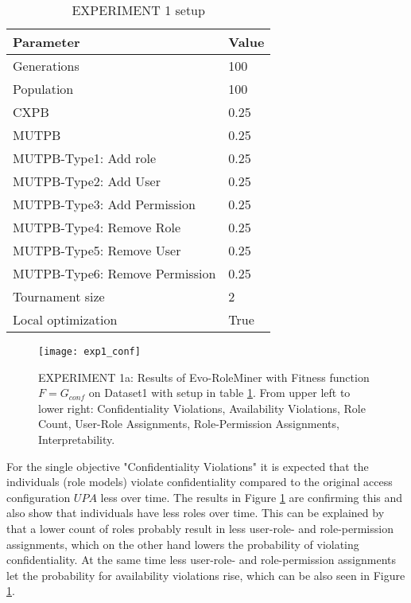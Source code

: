 \begin{table}[H]
    \centering
    \begin{adjustbox}{width=0.5\textwidth}
	    \begin{tabular}{|l|l|}
	        \hline
	        \rowcolor{gray!25} 
	        \textbf{Parameter}              & \textbf{Value}    \\ \hline
	        Generations                     & 100              \\ \hline
	        Population                      & 100              \\ \hline
	        CXPB                            & 0.25              \\ \hline
	        MUTPB                           & 0.25              \\ \hline
	        MUTPB-Type1: Add role           & 0.25              \\ \hline
	        MUTPB-Type2: Add User           & 0.25              \\ \hline
	        MUTPB-Type3: Add Permission     & 0.25              \\ \hline
	        MUTPB-Type4: Remove Role        & 0.25              \\ \hline
	        MUTPB-Type5: Remove User        & 0.25              \\ \hline
	        MUTPB-Type6: Remove Permission  & 0.25              \\ \hline
	        Tournament size                 & 2                 \\ \hline
	        Local optimization              & True              \\ \hline
	    \end{tabular}
	\end{adjustbox}
    \caption{EXPERIMENT 1 setup}
    \label{tab:exp1_setup}
\end{table}

\begin{figure}[H]
    \centering
    \texttt{[image: exp1\_conf]}
    \caption{EXPERIMENT 1a: Results of Evo-RoleMiner with Fitness function $F=G_{conf}$ on Dataset1 with setup in table \ref{tab:exp1_setup}. From upper left to lower right: Confidentiality Violations, Availability Violations, Role Count, User-Role Assignments, Role-Permission Assignments, Interpretability.}
    \label{fig:exp1_conf}
\end{figure}

For the single objective "Confidentiality Violations" it is expected that the individuals (role models) violate confidentiality compared to the original access configuration $UPA$ less over time. The results in Figure \ref{fig:exp1_conf} are confirming this and also show that individuals have less roles over time. This can be explained by that a lower count of roles probably result in less user-role- and role-permission assignments, which on the other hand lowers the probability of violating confidentiality. At the same time less user-role- and role-permission assignments let the probability for availability violations rise, which can be also seen in Figure \ref{fig:exp1_conf}.

